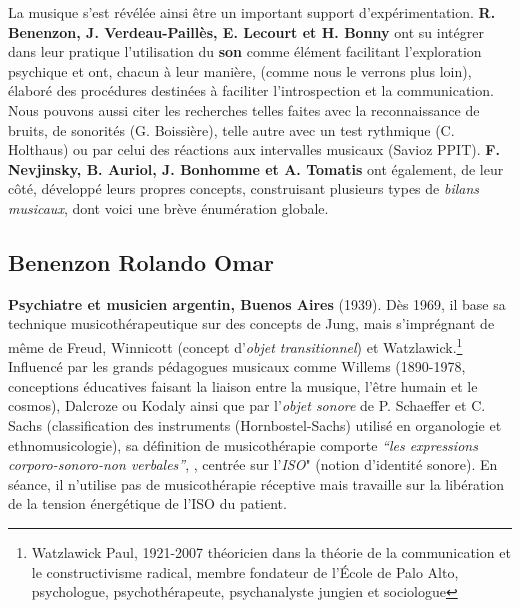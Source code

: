 	 La musique s'est révélée ainsi être un important support
         d'expérimentation.   \textbf{R. Benenzon, J. Verdeau-Paillès, E.
         Lecourt et H. Bonny} ont su intégrer dans leur pratique l'utilisation du\textbf{ son }comme
         élément facilitant l'exploration psychique et
         ont, chacun à leur manière, (comme nous le verrons plus loin), élaboré des procédures destinées à faciliter
         l'introspection et la communication. Nous pouvons aussi citer les recherches telles faites avec la reconnaissance de
bruits, de sonorités (G. Boissière), telle autre avec un test rythmique
(C. Holthaus) ou par celui
des réactions aux intervalles musicaux (Savioz PPIT).
\textbf{F. Nevjinsky, B. Auriol, J. Bonhomme
           et A. Tomatis} ont également, de leur côté, développé leurs propres
           concepts, construisant plusieurs types de \emph{bilans musicaux},
           dont voici une brève énumération globale.


          \subsection{Benenzon Rolando Omar}
	\textbf{ Psychiatre et
    musicien argentin, Buenos Aires} (1939).
	  \label{benenzon}
	  Dès 1969, il base sa technique
	  musicothérapeutique sur des concepts
	  de Jung, mais s'imprégnant de même de Freud, Winnicott \autocite{winnicott}
          (concept d'\textit{objet transitionnel})
          et Watzlawick.\footnote{ Watzlawick Paul, 1921-2007  théoricien dans la théorie de la communication et le constructivisme radical, membre fondateur de l'École de Palo Alto, psychologue, psychothérapeute, psychanalyste jungien et sociologue}
	  Influencé par les grands  pédagogues musicaux comme
          Willems  (1890-1978, conceptions éducatives faisant la liaison
          entre la musique, l'être humain et le cosmos),
          Dalcroze ou Kodaly ainsi que par l'\textit{objet sonore} de
          P. Schaeffer
          et C. Sachs (classification des instruments
          (Hornbostel-Sachs) utilisé en organologie et ethnomusicologie), sa définition de musicothérapie comporte
	  \emph{\textsl{ ``les expressions corporo-sonoro-non
              verbales''}}, \autocite{benenzon:musicotherapie},
	  centrée sur l'\textit{ISO}" (notion
          d'identité sonore). En séance, il n'utilise pas de
          musicothérapie réceptive mais travaille sur la libération de
          la tension énergétique de l'ISO du patient.

